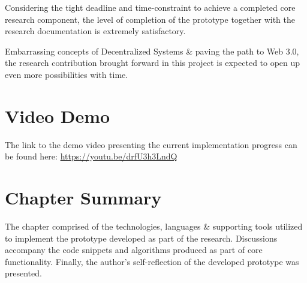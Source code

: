 Considering the tight deadline and time-constraint to achieve a completed core research component, the level of completion of the prototype together with the research documentation is extremely satisfactory.

Embarrassing concepts of Decentralized Systems \& paving the path to Web 3.0, the research contribution brought forward in this project is expected to open up even more possibilities with time.

\section{Video Demo}
The link to the demo video presenting the current implementation progress can be found here: \url{https://youtu.be/drfU3h3LndQ}

\section{Chapter Summary}
The chapter comprised of the technologies, languages \& supporting tools utilized to implement the prototype developed as part of the research. Discussions accompany the code snippets and algorithms produced as part of core functionality. Finally, the author's self-reflection of the developed prototype was presented.
